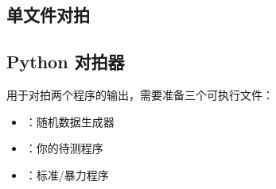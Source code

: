 

\subsection{单文件对拍}



\subsection{Python 对拍器}

用于对拍两个程序的输出，需要准备三个可执行文件：
\begin{itemize}
    \item {}：随机数据生成器
    \item {}：你的待测程序
    \item {}：标准/暴力程序
\end{itemize}


